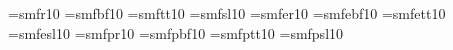 
\font\smfr=smfr10
\font\smfbf=smfbf10
\font\smftt=smftt10
\font\smfsl=smfsl10
\font\smfer=smfer10
\font\smfebf=smfebf10
\font\smfett=smfett10
\font\smfesl=smfesl10
\font\smfrp=smfpr10
\font\smfbfp=smfpbf10
\font\smfttp=smfptt10
\font\smfslp=smfpsl10

\endinput